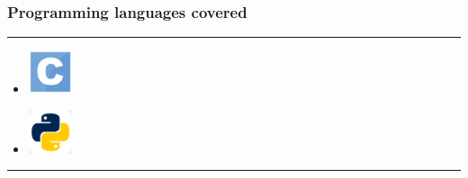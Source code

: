 \documentclass[14pt]{beamer}
\begin{document}
\begin{frame}
    \frametitle{Programming languages covered}
    \noindent
     {\color{pink} \rule{\linewidth}{1mm} }
    \begin{itemize}
        \item [] \includegraphics[width=0.5in, height=0.5in]{./logos/c.png}\hspace{1cm}{\huge C} \\
            \pause
        \item [] \includegraphics[width=0.5in, height=0.5in]{./logos/python.png}\hspace{1cm}{\huge Python} \\
    \end{itemize}
\noindent
    {\color{pink} \rule{\linewidth}{1mm} }
\end{frame}

   
\end{document}
